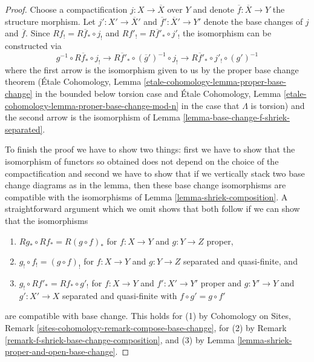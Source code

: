 \begin{proof}
Choose a compactification $j : X \to \overline{X}$ over $Y$
and denote $\overline{f} : \overline{X} \to Y$ the structure morphism.
Let $j' : X' \to \overline{X}'$ and $\overline{f}' : \overline{X}' \to Y'$
denote the base changes of $j$ and $\overline{f}$.
Since $Rf_! = R\overline{f}_* \circ j_!$ and $Rf'_! =
R\overline{f}'_* \circ j'_!$ the isomorphism can be constructed via
$$
g^{-1} \circ R\overline{f}_* \circ j_! \to
R\overline{f}'_* \circ (\overline{g}')^{-1} \circ j_! \to
R\overline{f}'_* \circ j'_! \circ (g')^{-1} 
$$
where the first arrow is the isomorphism given to us by the
proper base change theorem (\'Etale Cohomology, Lemma
\ref{etale-cohomology-lemma-proper-base-change} in the bounded below torsion
case and \'Etale Cohomology, Lemma
\ref{etale-cohomology-lemma-proper-base-change-mod-n} in the
case that $\Lambda$ is torsion) and the second arrow is the isomorphism of
Lemma \ref{lemma-base-change-f-shriek-separated}.

\medskip\noindent
To finish the proof we have to show two things: first we have to show
that the isomorphism of functors so obtained does not depend on
the choice of the compactification and second we have to show that
if we vertically stack two base change diagrams as in the lemma, then
these base change isomorphisms are compatible with the isomorphisms
of Lemma \ref{lemma-shriek-composition}.
A straightforward argument which we omit shows that both follow
if we can show that the isomorphisms
\begin{enumerate}
\item $Rg_* \circ Rf_* = R(g \circ f)_*$ for $f : X \to Y$ and $g : Y \to Z$
proper,
\item $g_! \circ f_! = (g \circ f)_!$ for $f : X \to Y$ and $g : Y \to Z$
separated and quasi-finite, and
\item $g_! \circ Rf'_* = Rf_* \circ g'_!$ for  $f : X \to Y$ and
$f' : X' \to Y'$ proper and $g : Y' \to Y$ and $g' : X' \to X$
separated and quasi-finite with $f \circ g' = g \circ f'$
\end{enumerate}
are compatible with base change. This holds for (1) by
Cohomology on Sites, Remark \ref{sites-cohomology-remark-compose-base-change},
for (2) by Remark \ref{remark-f-shriek-base-change-composition}, and
(3) by Lemma \ref{lemma-shriek-proper-and-open-base-change}.
\end{proof}















